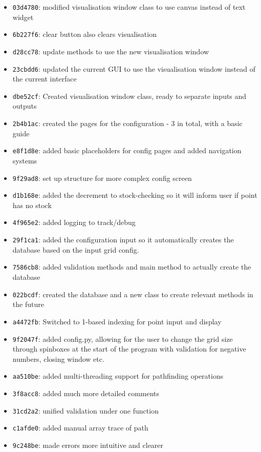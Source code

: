 \begin{itemize}
	\item \texttt{03d4780}: modified visualisation window class to use canvas instead of text widget
	\item \texttt{6b227f6}: clear button also clears visualisation
	\item \texttt{d28cc78}: update methods to use the new visualisation window
	\item \texttt{23cbdd6}: updated the current GUI to use the visualisation window instead of the current interface
	\item \texttt{dbe52cf}: Created visualisation window class, ready to separate inputs and outputs
	\item \texttt{2b4b1ac}: created the pages for the configuration - 3 in total, with a basic guide
	\item \texttt{e8f1d8e}: added basic placeholders for config pages and added navigation systems
	\item \texttt{9f29ad8}: set up structure for more complex config screen
	\item \texttt{d1b168e}: added the decrement to stock-checking so it will inform user if point has no stock
	\item \texttt{4f965e2}: added logging to track/debug
	\item \texttt{29f1ca1}: added the configuration input so it automatically creates the database based on the input grid config.
	\item \texttt{7586cb8}: added validation methods and main method to actually create the database
	\item \texttt{022bcdf}: created the database and a new class to create relevant methods in the future
	\item \texttt{a4472fb}: Switched to 1-based indexing for point input and display
	\item \texttt{9f2047f}: added config.py, allowing for the user to change the grid size through spinboxes at the start of the program with validation for negative numbers, closing window etc.
	\item \texttt{aa510be}: added multi-threading support for pathfinding operations
	\item \texttt{3f8acc8}: added much more detailed comments
	\item \texttt{31cd2a2}: unified validation under one function
	\item \texttt{c1afde0}: added manual array trace of path
	\item \texttt{9c248be}: made errors more intuitive and clearer

\end{itemize}
